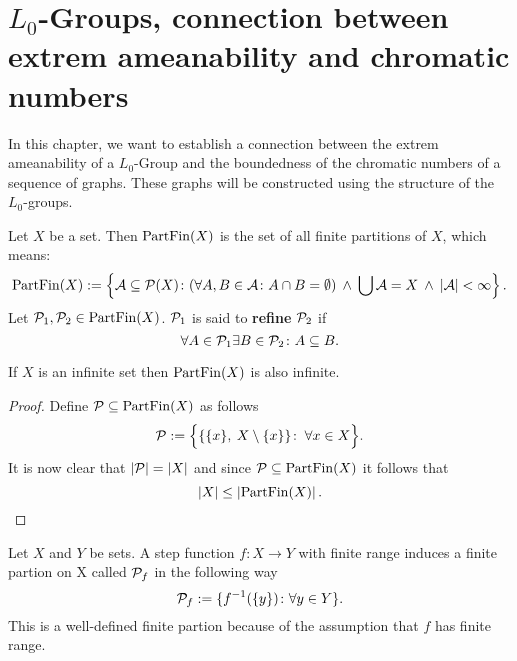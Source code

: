 \section{$L_0$-Groups, connection between extrem ameanability and chromatic numbers}

In this chapter, we want to establish a connection between the extrem ameanability of a $L_0$-Group and the boundedness of the chromatic numbers of a sequence of graphs.
These graphs will be constructed using the structure of the $L_0$-groups.

\begin{defin}
  Let $X$ be a set. Then ${\rm PartFin}(X)$ is the set of all finite partitions of $X$, which means:
  \begin{equation*}
    {\rm PartFin}(X) := \left\{ \mathcal{A} \subseteq \P(X)\colon (\forall A,B \in \mathcal{A}\colon A \cap B = \emptyset) \: \land \: \bigcup\mathcal{A} = X \: \land \: \left| \mathcal{A} \right| < \infty \right\}.
  \end{equation*}
  Let $\P_1, \P_2 \in {\rm PartFin}(X)$. $\P_1$ is said to \textbf{refine} $\P_2$ if
  \begin{equation*}
    \forall A \in \P_1\exists B \in \P_2\colon A \subseteq B.
  \end{equation*}
\end{defin}

\begin{rem}\label{rem:partfinsze}
  If $X$ is an infinite set then ${\rm PartFin}(X)$ is also infinite.
\end{rem}

\begin{proof}
  Define $\P \subseteq {\rm PartFin}(X)$ as follows
  \begin{equation*}
    \P := \Big\{ \{ \{x\}, \: X\setminus\{x\}\}\colon \: \forall x \in X \Big\}.
  \end{equation*}
  It is now clear that $\left| \P \right| = \left| X \right|$ and since $\P \subseteq {\rm PartFin}(X)$ it follows that 
  \begin{equation*}
    \left| X \right| \leq \left| {\rm PartFin}(X) \right|.
  \end{equation*}
\end{proof}

\begin{defin}
  Let $X$ and $Y$ be sets. A step function $f\colon X \to Y$ with finite range induces a finite partion on X called $\P_f$ in the following way
  \begin{equation*}
    \P_f := \{f^{-1}(\{y\})\colon \forall y \in Y\}.
  \end{equation*}
  This is a well-defined finite partion because of the assumption that $f$ has finite range.
\end{defin}

